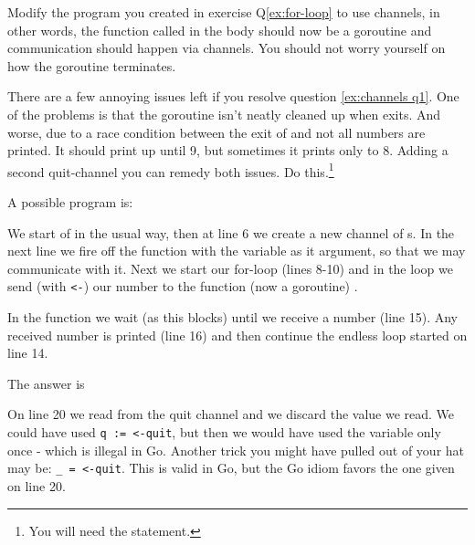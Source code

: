 \begin{Exercise}[title={Channels},difficulty=4]
\label{ex:channels}
\Question\label{ex:channels q1} Modify the program you created in
exercise Q\ref{ex:for-loop}
to use channels, in other words, the function called in the body
should now be a goroutine and communication should happen via
channels. You should not worry yourself on how the goroutine
terminates.

\Question\label{ex:channels q2} There are a few annoying issues left if
you resolve question \ref{ex:channels q1}. One of the problems is
that the goroutine isn't neatly cleaned up when 
exits. And worse, due to a race condition between the exit of 
 and  not all numbers are printed.
It should print up until 9, but sometimes it prints only to 8. Adding
a second quit-channel you can remedy both issues. Do this.\footnote{You
will need the  statement.}

\end{Exercise}

\begin{Answer}
\Question A possible program is: 

We start of in the usual way, then at line 6 we create a new channel of
s. In the next line we fire off the function  with
the  variable as it argument, so that we may communicate with
it. Next we start our for-loop (lines 8-10) and in the loop
we send (with \lstinline{<-}) our number to the function (now a goroutine) .

In the function  we wait (as this blocks) until we receive a number (line
15). Any received number is printed (line 16) and then continue the endless loop
started on line 14.

\Question The answer is

On line 20 we read from the quit channel and we discard the value we
read. We could have used \lstinline{q := <-quit}, but then we would have used
the variable only once - which is illegal in Go. Another trick you
might have pulled out of your hat may be: \lstinline{_ = <-quit}. This is
valid in Go, but the Go idiom favors the one given on line 20.
\end{Answer}
